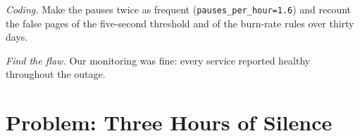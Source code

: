 \begin{exercise}[$\star\star\star$]\label{exo:pl:observability-and-incident-response:7}
\emph{Coding.} Make the pauses twice as frequent (\texttt{pauses\_per\_hour=1.6}) and recount the false pages of the five-second threshold and
of the burn-rate rules over thirty days.
\end{exercise}

\begin{exercise}[$\star\star\star$]\label{exo:pl:observability-and-incident-response:8}
\emph{Find the flaw.} \textquotedbl{}Our monitoring was fine: every service reported healthy throughout the outage.\textquotedbl{}
\end{exercise}

\section{Problem: Three Hours of Silence}

